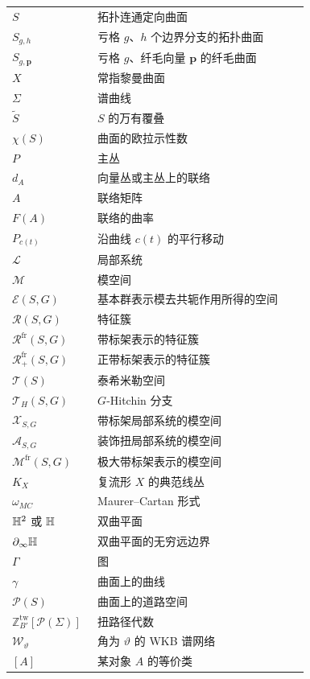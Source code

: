 \begin{longtable}{@{}p{0.27\linewidth}p{0.67\linewidth}@{}}
$S$ & 拓扑连通定向曲面 \\
$S_{g,h}$ & 亏格 $g$、$h$ 个边界分支的拓扑曲面 \\
$S_{g,\mathbf{p}}$ & 亏格 $g$、纤毛向量 $\mathbf{p}$ 的纤毛曲面 \\
$X$ & 常指黎曼曲面 \\
$\Sigma$ & 谱曲线 \\
$\tilde S$ & $S$ 的万有覆叠 \\
$\chi(S)$ & 曲面的欧拉示性数 \\
$P$ & 主丛 \\
$d_A$ & 向量丛或主丛上的联络 \\
$A$ & 联络矩阵 \\
$F(A)$ & 联络的曲率 \\
$P_{c(t)}$ & 沿曲线 $c(t)$ 的平行移动 \\
$\mathcal{L}$ & 局部系统 \\
$\mathcal{M}$ & 模空间 \\
$\mathcal{E}(S,G)$ & 基本群表示模去共轭作用所得的空间 \\
$\mathcal{R}(S,G)$ & 特征簇 \\
$\mathcal{R}^{\mathrm{fr}}(S,G)$ & 带标架表示的特征簇 \\
$\mathcal{R}^{\mathrm{fr}}_+(S,G)$ & 正带标架表示的特征簇 \\
$\mathcal{T}(S)$ & 泰希米勒空间 \\
$\mathcal{T}_H(S,G)$ & $G$-Hitchin 分支 \\
$\mathcal{X}_{S,G}$ & 带标架局部系统的模空间 \\
$\mathcal{A}_{S,G}$ & 装饰扭局部系统的模空间 \\
$\mathcal{M}^{\mathrm{fr}}(S,G)$ & 极大带标架表示的模空间 \\
$K_X$ & 复流形 $X$ 的典范线丛 \\
$\omega_{MC}$ & Maurer–Cartan 形式 \\
$\mathbb{H}^2$ 或 $\mathbb{H}$ & 双曲平面 \\
$\partial_\infty\mathbb{H}$ & 双曲平面的无穷远边界 \\
$\Gamma$ & 图 \\
$\gamma$ & 曲面上的曲线 \\
$\mathcal{P}(S)$ & 曲面上的道路空间 \\
$\mathbb{Z}^{\mathrm{tw}}_{B'}[\mathcal{P}(\Sigma)]$ & 扭路径代数 \\
$\mathcal{W}_\vartheta$ & 角为 $\vartheta$ 的 WKB 谱网络 \\
$[A]$ & 某对象 $A$ 的等价类 \\

\end{longtable}
